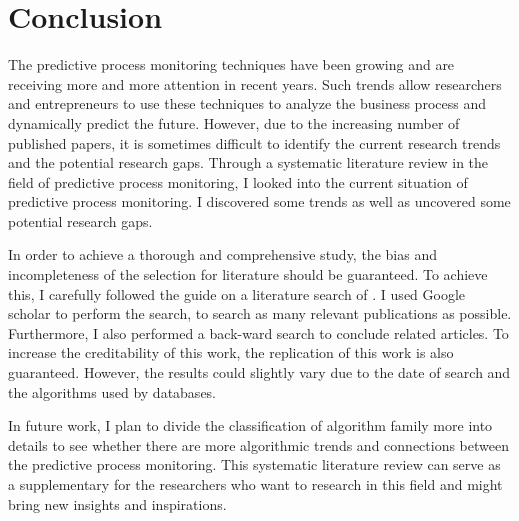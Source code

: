 \documentclass[runningheads]{llncs}
\begin{document}
		
		\section{Conclusion}
		The predictive process monitoring techniques have been growing and are receiving more and more attention in recent years. Such trends allow researchers and entrepreneurs to use these techniques to analyze the business process and dynamically predict the future. However, due to the increasing number of published papers, it is sometimes difficult to identify the current research trends and the potential research gaps. Through a systematic literature review in the field of predictive process monitoring, I looked into the current situation of predictive process monitoring. I discovered some trends as well as uncovered some potential research gaps.
		
		In order to achieve a thorough and comprehensive study, the bias and incompleteness of the selection for literature should be guaranteed. To achieve this, I carefully followed the guide on a literature search of \cite{guideline}. I used Google scholar to perform the search, to search as many relevant publications as possible. Furthermore, I also performed a back-ward search to conclude related articles. To increase the creditability of this work, the replication of this work is also guaranteed. However, the results could slightly vary due to the date of search and the algorithms used by databases.
		
		In future work, I plan to divide the classification of algorithm family more into details to see whether there are more algorithmic trends and connections between the predictive process monitoring. This systematic literature review can serve as a supplementary for the researchers who want to research in this field and might bring new insights and inspirations.
		
\end{document}
